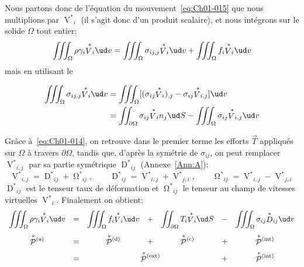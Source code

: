Nous partons donc de l'équation du mouvement~\eqref{eq:Ch01-015} que nous multiplions par ${\mathop{V}^{*}}_i$ (il s'agit donc d'un produit scalaire), et nous intégrons sur le solide $\Omega$ tout entier:
\begin{equation*}
    \iiint_{\Omega}\rho\gamma_i {\mathop{V}^{*}}_i \ud v=\iiint_{\Omega}\sigma_{ij,j} {\mathop{V}^{*}}_i \ud v+\iiint_{\Omega}f_i {\mathop{V}^{*}}_i \ud v
\end{equation*}
mais en utilisant le
\begin{thmn}
\begin{align*}
    \iiint_{\Omega}\sigma_{ij,j} {\mathop{V}^{*}}_i \ud v &= \iiint_{\Omega}[(\sigma_{ij} {\mathop{V}^{*}}_i)_{,j}-\sigma_{ij} {\mathop{V}^{*}}_{i,j}]\ud v\\
    &=\iint_{\partial \Omega}\sigma_{ij} {\mathop{V}^{*}}_i n_j \ud S-\iiint_{\Omega} \sigma_{ij} {\mathop{V}^{*}}_{i,j} \ud v
\end{align*}
\end{thmn}
Grâce à~\eqref{eq:Ch01-014}, on retrouve dans le premier terme les efforts $\vec{T}$ appliqués sur $\Omega$ à travers $\partial \Omega$, tandis que, d'après la symétrie de $\sigma_{ij}$, on peut remplacer ${\mathop{V}^{*}}_{i,j}$ par sa partie symétrique ${\mathop{D}^{*}}_{ij}$ (Annexe~\ref{Ann:A}):
\begin{equation}
    {\mathop{V}^{{\ast}}}_{i,j}={\mathop{D}^{{\ast}}}_{ij}+{\mathop{\Omega}^{{\ast}}}_{ij},\qquad
    {\mathop{D}^{{\ast}}}_{ij}={\mathop{V}^{{\ast}}}_{i,j}+{\mathop{V}^{{\ast}}}_{j,i},\qquad
    {\mathop{\Omega}^{{\ast}}}_{ij}={\mathop{V}^{{\ast}}}_{i,j}-{\mathop{V}^{{\ast}}}_{j,i}
    \label{eq:Ch01-023}
\end{equation}
$\displaystyle{\mathop{D}^{{\ast}}}_{ij}$ est le tenseur taux de déformation et ${\mathop{\Omega}^{{\ast}}}_{ij}$ le tenseur au champ de vitesses virtuelles ${\mathop{V}^{{\ast}}}_i$.
Finalement on obtient:
\begin{equation}
    \everymath{\displaystyle}
    \begin{array}{ccccccc}
        \iiint_{\Omega}\rho\gamma_i {\mathop{V}^{\ast}}_i \ud v & =& \iiint_{\Omega}f_i {\mathop{V}^{\ast}}_i \ud v & + & \iint_{\partial\Omega}T_i {\mathop{V}^{\ast}}_i \ud S & -& \iiint_{\Omega}\sigma_{ij} {\mathop{D}^{\ast}}_{ij} \ud v\\[13pt]
        \mathop{\mathcal{P}}^{\ast}{\!}^{(\text{a})} & = &\mathop{\mathcal{P}}^{\ast}{\!}^{(\text{d})} & + &\mathop{\mathcal{P}}^{\ast}{\!}^{(\text{c})} & + &\mathop{\mathcal{P}}^{\ast}{\!}^{(\text{int})}\\[6pt]
        & =  & \multicolumn{3}{c}{\mathop{\mathcal{P}}^{\ast}{\!}^{(\text{ext})}} & + &\mathop{\mathcal{P}}^{\ast}{\!}^{(\text{int})}
    \end{array}
    \label{eq:Ch01-024}
\end{equation}
